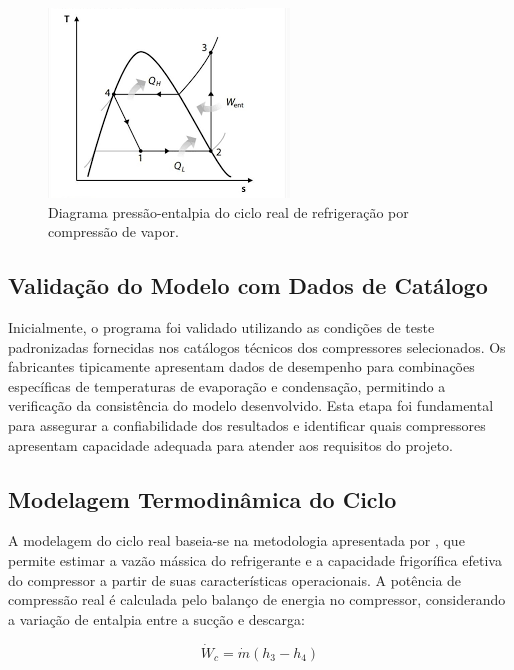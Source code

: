 \begin{figure}[ht]
    \centering
    \includegraphics[width=0.6\linewidth]{Imagens/Desenvolvimento/Diagrama.png}
    \caption{Diagrama pressão-entalpia do ciclo real de refrigeração por compressão de vapor.}
    \label{fig:ciclo padrão}
\end{figure}


\subsection{Validação do Modelo com Dados de Catálogo}

Inicialmente, o programa foi validado utilizando as condições de teste padronizadas fornecidas nos catálogos técnicos dos compressores selecionados. Os fabricantes tipicamente apresentam dados de desempenho para combinações específicas de temperaturas de evaporação e condensação, permitindo a verificação da consistência do modelo desenvolvido. Esta etapa foi fundamental para assegurar a confiabilidade dos resultados e identificar quais compressores apresentam capacidade adequada para atender aos requisitos do projeto.

\subsection{Modelagem Termodinâmica do Ciclo}

A modelagem do ciclo real baseia-se na metodologia apresentada por \cite{paper_referencia}, que permite estimar a vazão mássica do refrigerante e a capacidade frigorífica efetiva do compressor a partir de suas características operacionais. A potência de compressão real é calculada pelo balanço de energia no compressor, considerando a variação de entalpia entre a sucção e descarga:

\begin{equation}
    \dot{W}_c = \dot{m}(h_3 - h_4)
    \label{W compressor}
\end{equation}

